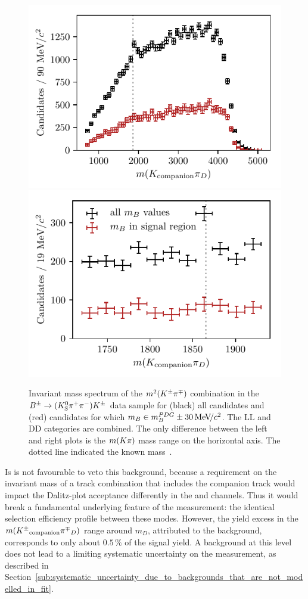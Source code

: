 \begin{figure}[tbp]
    \centering
    \includegraphics[width=0.45\columnwidth]{figures/analysis/background_checks/swapped_track_all_D.pdf}
    \includegraphics[width=0.45\columnwidth]{figures/analysis/background_checks/swapped_track_sig_D.pdf}

    \caption{Invariant mass spectrum of the $m^2({{K}^\pm}{{\pi}^\mp})$ combination in the ${{{B}^\pm}\rightarrow({{K}^0_{\mathrm{S}}}{{\pi}^+}{{\pi}^-}){{K}^\pm}}$ data sample for (black) all candidates and (red) candidates for which $m_B\in m_B^{PDG}\pm30\text{\,Me\kern -0.1em V\!/}c^2$. The LL and  DD categories are combined. The only difference between the left and right plots is the $m({K}\pi)$ mass range on the horizontal axis. The dotted line indicated the known \D mass~\cite{PDG2020}.}
    \label{fig:swapped_backgrounds}
\end{figure}

Is is not favourable to veto this background, because a requirement on the invariant mass of a track combination that includes the companion track would impact the Dalitz-plot acceptance differently in the {\DK} and {\Dpi} channels. Thus it would break a fundamental underlying feature of the measurement: the identical selection efficiency profile between these modes. However, the yield excess in the $m({{K}^\pm}_\mathrm{companion}{{\pi}^\mp}_D)$ range around $m_D$, attributed to the background, corresponds to only about $0.5\,\%$ of the signal yield. A background at this level does not lead to a limiting systematic uncertainty on the measurement, as described in Section~\ref{sub:systematic_uncertainty_due_to_backgrounds_that_are_not_modelled_in_fit}.



